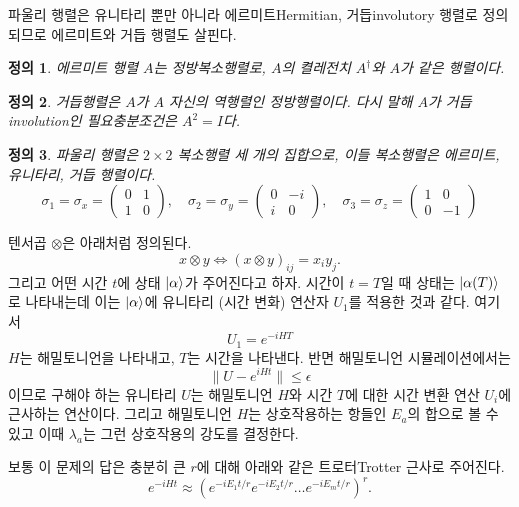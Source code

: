\documentclass[a4paper,atbegshi,chapter]{oblivoir}
\newtheorem{defn}{정의}[chapter]
\begin{document}
파울리 행렬은 유니타리 뿐만 아니라 에르미트{\tiny Hermitian},
거듭{\tiny involutory} 행렬로 정의되므로 에르미트와 거듭 행렬도 살핀다.
\begin{defn}
  에르미트 행렬 $A$는 정방복소행렬로, $A$의 켤레전치 $A^{\dagger}$와 $A$가
  같은 행렬이다.
\end{defn}
\begin{defn}
  거듭행렬은 $A$가 $A$ 자신의 역행렬인 정방행렬이다. 다시 말해 $A$가 거듭{\tiny
  involution}인 필요충분조건은 $A^2=I$다.
\end{defn}
\begin{defn}
  파울리 행렬은 $2\times2$ 복소행렬 세 개의 집합으로, 이들 복소행렬은 에르미트,
  유니타리, 거듭 행렬이다. 
  \[
    \sigma_1 = \sigma_x = \begin{pmatrix}0 & 1 \\ 1 & 0\end{pmatrix},\quad
    \sigma_2 = \sigma_y = \begin{pmatrix} 0 & -i \\ i & 0\end{pmatrix},\quad
    \sigma_3 = \sigma_z = \begin{pmatrix}1 & 0 \\ 0 & -1\end{pmatrix}
  \]
\end{defn}
텐서곱 $\otimes$은 아래처럼 정의된다.
\[
  x\otimes y \iff (x\otimes y)_{ij}=x_iy_j.
\]
그리고 어떤 시간 $t$에 상태 $\ket{\alpha}$가 주어진다고 하자. 시간이 $t=T$일 때
상태는 $\ket{\alpha(T)}$로 나타내는데 이는 $\ket{\alpha}$에 유니타리 (시간 변화) 
연산자 $U_1$를 적용한 것과 같다. 여기서 
\[
  U_1 = e^{-iHT}
\]
$H$는 해밀토니언을 나타내고, $T$는 시간을 나타낸다. 반면 해밀토니언
시뮬레이션에서는
\[
  \|U-e^{iHt}\|\leq\epsilon
\]
이므로 구해야 하는 유니타리 $U$는 해밀토니언 $H$와 시간 $T$에 대한 시간 변환
연산 $U_i$에 근사하는 연산이다. 그리고 해밀토니언 $H$는 상호작용하는 항들인
$E_a$의 합으로 볼 수 있고 이때 $\lambda_a$는 그런 상호작용의 강도를 결정한다.

보통 이 문제의 답은 충분히 큰 $r$에 대해 아래와 같은 트로터{\tiny Trotter}
근사로 주어진다.
\[
  e^{-iHt}\approx (e^{-iE_1t/r}e^{-iE_2t/r}\ldots e^{-iE_mt/r})^r.
\]
\end{document}
